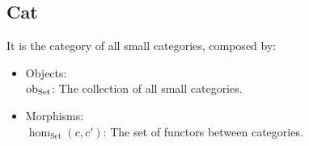 \subsection{Cat}
It is the category of all small categories, composed by:
\parencite{adamek_herrlich_strecker:joy_cats}
\begin{itemize}
  \item Objects:\\
    $\mathrm{ob}_{\mathrm{Set}}$: The collection of all small categories.
  \item Morphisms:\\
    $\hom_{\mathrm{Set}}(c, c')$: The set of functors between categories.
\end{itemize}